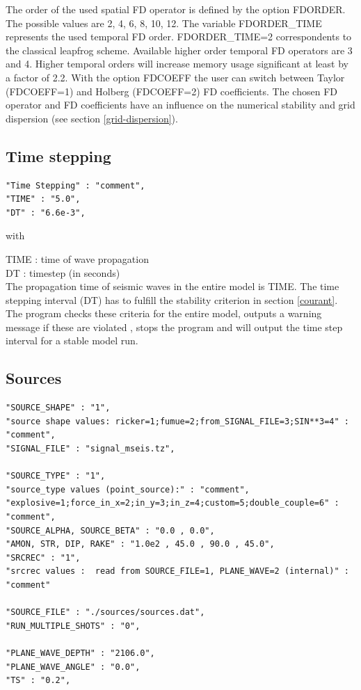 \documentclass{hitec}
\begin{document}
The order of the used spatial FD operator is defined by the option FDORDER. The possible values are 2, 4, 6, 8, 10, 12. 
The variable FDORDER\_TIME represents the used temporal FD order. FDORDER\_TIME=2 correspondents to the classical leapfrog scheme. Available higher order temporal FD operators are 3 and 4. Higher temporal orders will increase memory usage significant at least by a factor of 2.2. With the option FDCOEFF the user can switch between Taylor (FDCOEFF=1) and Holberg (FDCOEFF=2) FD coefficients. The chosen FD operator and FD coefficients have an influence on the numerical stability and grid dispersion (see section \ref{grid-dispersion}).


\subsection{Time stepping}
\begin{verbatim}
"Time Stepping" : "comment",
"TIME" : "5.0",
"DT" : "6.6e-3",
\end{verbatim}

with

TIME : time of wave propagation\\
DT : timestep (in seconds)\\


The propagation time of seismic waves in the entire model is TIME. The time stepping interval (DT) has to fulfill the stability criterion  in section \ref{courant}. 
The program checks these criteria for the entire model, outputs a warning message if these are violated , stops the program and will output the time step interval for a stable model run. 


\subsection{Sources}
\label{Sources}
\begin{verbatim}
"SOURCE_SHAPE" : "1",
"source shape values: ricker=1;fumue=2;from_SIGNAL_FILE=3;SIN**3=4" : "comment",
"SIGNAL_FILE" : "signal_mseis.tz",

"SOURCE_TYPE" : "1",
"source_type values (point_source):" : "comment",
"explosive=1;force_in_x=2;in_y=3;in_z=4;custom=5;double_couple=6" : "comment",
"SOURCE_ALPHA, SOURCE_BETA" : "0.0 , 0.0",
"AMON, STR, DIP, RAKE" : "1.0e2 , 45.0 , 90.0 , 45.0",
"SRCREC" : "1",
"srcrec values :  read from SOURCE_FILE=1, PLANE_WAVE=2 (internal)" : "comment"
            
"SOURCE_FILE" : "./sources/sources.dat", 
"RUN_MULTIPLE_SHOTS" : "0", 
            
"PLANE_WAVE_DEPTH" : "2106.0",
"PLANE_WAVE_ANGLE" : "0.0",
"TS" : "0.2",
\end{verbatim}
\end{document}
